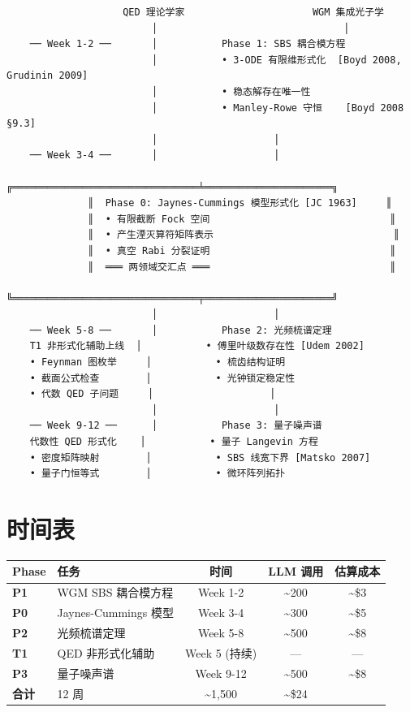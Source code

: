 \documentclass[
  11pt,
  a4paper,
]{ctexrep}
\newcounter{none} %
\begin{document}
\begin{verbatim}
                    QED 理论学家                      WGM 集成光子学
                         │                                │
    ── Week 1-2 ──       │           Phase 1: SBS 耦合模方程
                         │           • 3-ODE 有限维形式化  [Boyd 2008, Grudinin 2009]
                         │           • 稳态解存在唯一性
                         │           • Manley-Rowe 守恒    [Boyd 2008 §9.3]
                         │                    │
    ── Week 3-4 ──       │                    │
              ╔════════════════════════════════╧══════════════════════╗
              ║  Phase 0: Jaynes-Cummings 模型形式化 [JC 1963]     ║
              ║  • 有限截断 Fock 空间                               ║
              ║  • 产生湮灭算符矩阵表示                               ║
              ║  • 真空 Rabi 分裂证明                               ║
              ║  ═══ 两领域交汇点 ═══                               ║
              ╚════════════════════════════════╤══════════════════════╝
                         │                    │
    ── Week 5-8 ──       │           Phase 2: 光频梳谱定理
    T1 非形式化辅助上线  │           • 傅里叶级数存在性 [Udem 2002]
    • Feynman 图枚举     │           • 梳齿结构证明
    • 截面公式检查        │           • 光钟锁定稳定性
    • 代数 QED 子问题     │                    │
                         │                    │
    ── Week 9-12 ──      │           Phase 3: 量子噪声谱
    代数性 QED 形式化    │           • 量子 Langevin 方程
    • 密度矩阵映射        │           • SBS 线宽下界 [Matsko 2007]
    • 量子门恒等式        │           • 微环阵列拓扑
\end{verbatim}

\section{时间表}\label{ux65f6ux95f4ux8868}

{\def\LTcaptype{none} %
\begin{longtable}[]{@{}llccc@{}}
\toprule\noalign{}
Phase & 任务 & 时间 & LLM 调用 & 估算成本 \\
\midrule\noalign{}
\endhead
\bottomrule\noalign{}
\endlastfoot
\textbf{P1} & WGM SBS 耦合模方程 & Week 1-2 & \textasciitilde200 &
\textasciitilde\$3 \\
\textbf{P0} & Jaynes-Cummings 模型 & Week 3-4 & \textasciitilde300 &
\textasciitilde\$5 \\
\textbf{P2} & 光频梳谱定理 & Week 5-8 & \textasciitilde500 &
\textasciitilde\$8 \\
\textbf{T1} & QED 非形式化辅助 & Week 5 (持续) & --- & --- \\
\textbf{P3} & 量子噪声谱 & Week 9-12 & \textasciitilde500 &
\textasciitilde\$8 \\
\textbf{合计} & 12 周 & \textasciitilde1,500 & \textasciitilde\$24 & \\
\end{longtable}
}
\end{document}
